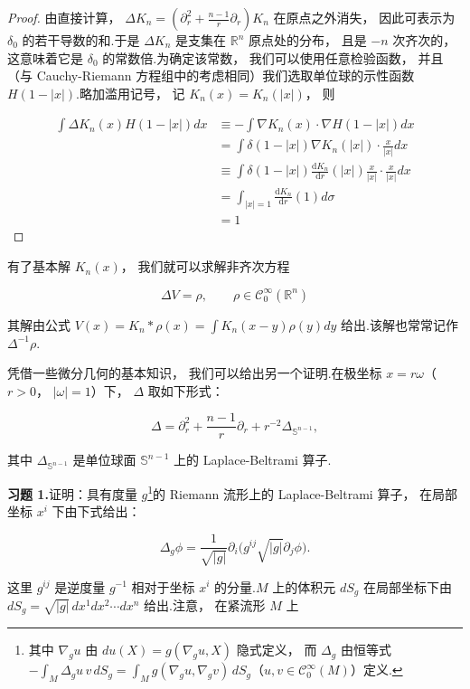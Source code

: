 \begin{proof}
由直接计算， $\Delta K_{n} = (\partial_{r}^{2} + \frac{n-1}{r}\partial_{r})K_{n}$ 在原点之外消失， 因此可表示为 $\delta_{0}$ 的若干导数的和.于是 $\Delta K_{n}$ 是支集在 $\mathbb{R}^{n}$ 原点处的分布， 且是 $-n$ 次齐次的， 这意味着它是 $\delta_{0}$ 的常数倍.为确定该常数， 我们可以使用任意检验函数， 并且（与 Cauchy-Riemann 方程组中的考虑相同）我们选取单位球的示性函数 $H(1-|x|)$.略加滥用记号， 记 $K_{n}(x) = K_{n}(|x|)$， 则

\[
\begin{aligned}
\int \Delta K_{n}(x)H(1-|x|)dx &\equiv -\int \nabla K_{n}(x) \cdot \nabla H(1-|x|)dx \\
&= \int \delta(1-|x|)\nabla K_{n}(|x|) \cdot \frac{x}{|x|}dx \\
&\equiv \int \delta(1-|x|)\frac{\mathrm{d}K_{n}}{\mathrm{d}r}(|x|)\frac{x}{|x|} \cdot \frac{x}{|x|}dx \\
&= \int_{|x|=1}\frac{\mathrm{d}K_{n}}{\mathrm{d}r}(1)d\sigma \\
&= 1
\end{aligned}
\]
\end{proof}

有了基本解 $K_{n}(x)$， 我们就可以求解非齐次方程

\[
\Delta V = \rho, \qquad \rho \in \mathcal{C}_{0}^{\infty}(\mathbb{R}^{n})
\]

其解由公式 $V(x) = K_{n}*\rho(x) = \int K_{n}(x-y)\rho(y)dy$ 给出.该解也常常记作 $\Delta^{-1}\rho$.

凭借一些微分几何的基本知识， 我们可以给出另一个证明.在极坐标 $x = r\omega$（$r > 0$， $|\omega| = 1$）下， $\Delta$ 取如下形式：

\[
\Delta = \partial_{r}^{2} + \frac{n-1}{r}\partial_{r} + r^{-2}\Delta_{\mathbb{S}^{n-1}},
\]

其中 $\Delta_{\mathbb{S}^{n-1}}$ 是单位球面 $\mathbb{S}^{n-1}$ 上的 Laplace-Beltrami 算子.

\noindent\textbf{习题 1.}\quad 证明：具有度量 $g$\footnote{其中 $\nabla_{g}u$ 由 $du(X) = g(\nabla_{g}u, X)$ 隐式定义， 而 $\Delta_{g}$ 由恒等式 $-\int_{M}\Delta_{g}u\, v\, dS_{g} = \int_{M}g(\nabla_{g}u, \nabla_{g}v)\, dS_{g}$（$u, v \in \mathcal{C}_{0}^{\infty}(M)$）定义.}的 Riemann 流形上的 Laplace-Beltrami 算子， 在局部坐标 $x^{i}$ 下由下式给出：

\[
\Delta_{g}\phi = \frac{1}{\sqrt{|g|}}\partial_{i}\bigl(g^{ij}\sqrt{|g|}\partial_{j}\phi\bigr).
\]

这里 $g^{ij}$ 是逆度量 $g^{-1}$ 相对于坐标 $x^{i}$ 的分量.$M$ 上的体积元 $dS_{g}$ 在局部坐标下由 $dS_{g} = \sqrt{|g|}\, dx^{1}dx^{2}\cdots dx^{n}$ 给出.注意， 在紧流形 $M$ 上

